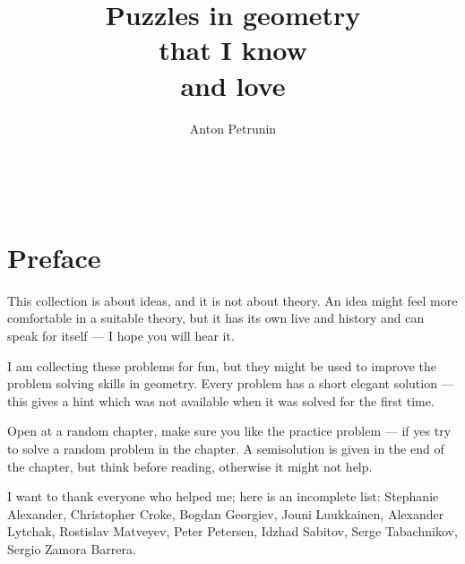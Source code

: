 \documentclass[twoside]{book}
\begin{document}
\title{Puzzles in geometry \\
that I know \\ and love}
\author{Anton Petrunin}
\maketitle

\null\vfill{}

\ 

\thispagestyle{empty}
\thispagestyle{empty}
\tableofcontents
\thispagestyle{empty}

\newpage
\thispagestyle{empty}
\section*{Preface}

This collection is about ideas, and it is not about theory.
An idea might feel more comfortable in a suitable theory,
but it has its own live and history and can speak for itself --- I hope you will hear it.

I am collecting these problems for fun, 
but they might be used to improve 
the problem solving skills in geometry.
Every problem has a short elegant solution ---
this gives a hint which was not available
when it was solved for the first time.

Open at a random chapter, make sure you like the practice problem --- if yes try to solve a random problem in the chapter.
A semisolution is given in the end of the chapter,
but think before reading,
otherwise it might not help. 

I want to thank everyone who helped me;
here is an incomplete list:
Stephanie Alexander,
Christopher Croke,
Bogdan Georgiev,
Jouni Luukkainen,
Alexander Lytchak,
Rostislav Matveyev, 
Peter Petersen, 
Idzhad Sabitov,
Serge Tabachnikov,
Sergio Zamora Barrera.
\end{document}
